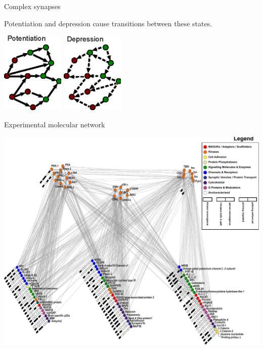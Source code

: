 \documentclass[final,hyperref={pdfpagelabels=false,bookmarks=false}]{beamer}
\newcommand{\citerr}[1]{\hfill {\footnotesize{\color{darkgrey}\cite{#1}}}}
\newcommand{\net}{molecular network}
\begin{document}
\begin{frame}{}
\begin{columns}[t]
\begin{column}{0.27\linewidth}
\begin{block}{Complex synapses}
\vp
\parbox{15cm}{
 Potentiation and depression cause transitions between these states.
}
\hfill%
\parbox{9cm}{
 \includegraphics[width=3cm]{pot.eps}
 \hspace{2cm}
 \includegraphics[width=3cm]{dep.eps}
}

 \vp
 \parbox[t]{10cm}{
 Experimental \net
 
 \citerr{Coba2009phosphorylation}
 }\hfill
\parbox[t]{17cm}{
 \begin{center}
 \includegraphics[width=15cm]{2000102CobaFig4.pdf}
 \end{center}
}
%
\end{block}



\end{column}
\end{columns}
\end{frame}
\end{document}
